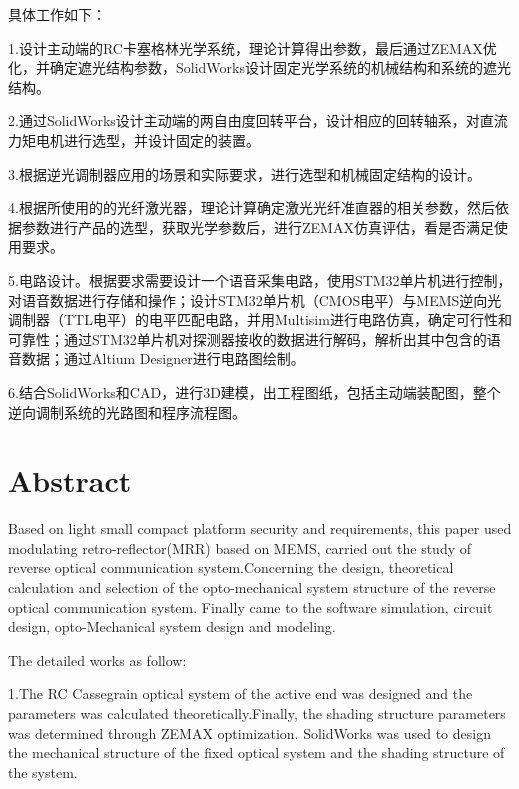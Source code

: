 具体工作如下：

1.设计主动端的RC卡塞格林光学系统，理论计算得出参数，最后通过ZEMAX优化，并确定遮光结构参数，SolidWorks设计固定光学系统的机械结构和系统的遮光结构。

2.通过SolidWorks设计主动端的两自由度回转平台，设计相应的回转轴系，对直流力矩电机进行选型，并设计固定的装置。

3.根据逆光调制器应用的场景和实际要求，进行选型和机械固定结构的设计。

4.根据所使用的的光纤激光器，理论计算确定激光光纤准直器的相关参数，然后依据参数进行产品的选型，获取光学参数后，进行ZEMAX仿真评估，看是否满足使用要求。

5.电路设计。根据要求需要设计一个语音采集电路，使用STM32单片机进行控制，对语音数据进行存储和操作；设计STM32单片机（CMOS电平）与MEMS逆向光调制器（TTL电平）的电平匹配电路，并用Multisim进行电路仿真，确定可行性和可靠性；通过STM32单片机对探测器接收的数据进行解码，解析出其中包含的语音数据；通过Altium Designer进行电路图绘制。

6.结合SolidWorks和CAD，进行3D建模，出工程图纸，包括主动端装配图，整个逆向调制系统的光路图和程序流程图。



\chapter*{Abstract}%
Based on light small compact platform security and requirements, this paper used modulating retro-reflector(MRR) based on MEMS, carried out the study of reverse optical communication system.Concerning the design, theoretical calculation and selection of the  opto-mechanical system structure of the reverse optical communication system. Finally came to the software simulation, circuit design,  opto-Mechanical system design and modeling.

The detailed works as follow:

1.The RC Cassegrain  optical system of the active end was designed and the parameters was calculated theoretically.Finally, the shading structure parameters was determined through ZEMAX optimization. SolidWorks was used to design the mechanical structure of the fixed optical system and the shading structure of the system.

